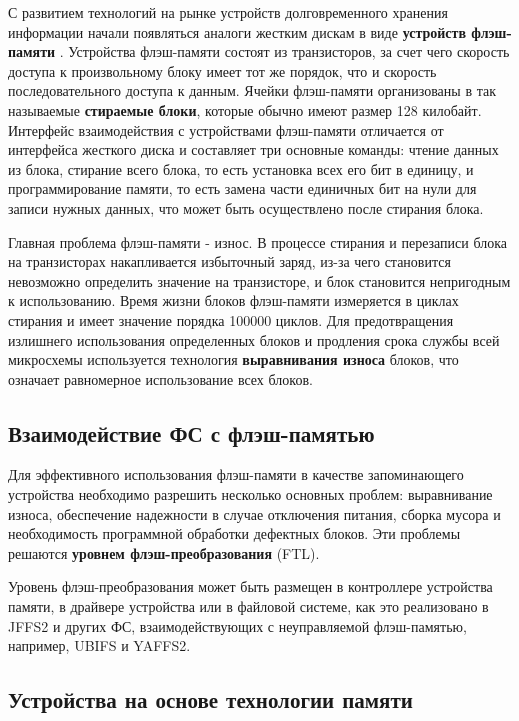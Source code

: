 С развитием технологий на рынке устройств долговременного хранения информации начали появляться аналоги жестким дискам в виде \textbf{устройств флэш-памяти} \cite{embedded}. Устройства флэш-памяти состоят из транзисторов, за счет чего скорость доступа к произвольному блоку имеет тот же порядок, что и скорость последовательного доступа к данным. Ячейки флэш-памяти организованы в так называемые \textbf{стираемые блоки}, которые обычно имеют размер 128 килобайт. Интерфейс взаимодействия с устройствами флэш-памяти отличается от интерфейса жесткого диска и составляет три основные команды: чтение данных из блока, стирание всего блока, то есть установка всех его бит в единицу, и программирование памяти, то есть замена части единичных бит на нули для записи нужных данных, что может быть осуществлено после стирания блока.

Главная проблема флэш-памяти - износ. В процессе стирания и перезаписи блока на транзисторах накапливается избыточный заряд, из-за чего становится невозможно определить значение на транзисторе, и блок становится непригодным к использованию. Время жизни блоков флэш-памяти измеряется в циклах стирания и имеет значение порядка 100000 циклов. Для предотвращения излишнего использования определенных блоков и продления срока службы всей микросхемы используется технология \textbf{выравнивания износа} блоков, что означает равномерное использование всех блоков.

\subsection{Взаимодействие ФС с флэш-памятью}

Для эффективного использования флэш-памяти в качестве запоминающего устройства необходимо разрешить несколько основных проблем: выравнивание износа, обеспечение надежности в случае отключения питания, сборка мусора и необходимость программной обработки дефектных блоков. Эти проблемы решаются \textbf{уровнем флэш-преобразования} (FTL). 

Уровень флэш-преобразования может быть размещен в контроллере устройства памяти, в драйвере устройства или в файловой системе, как это реализовано в JFFS2 и других ФС, взаимодействующих с неуправляемой флэш-памятью, например, UBIFS и YAFFS2.

\subsection{Устройства на основе технологии памяти}

